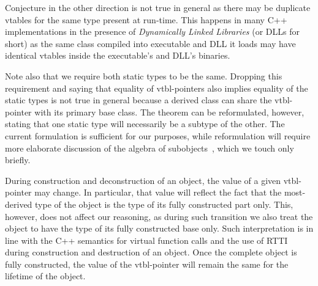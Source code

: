 \noindent
Conjecture in the other direction is not true in general as there may be 
duplicate vtables for the same type present at run-time. This happens in 
many C++ implementations in the presence of \emph{Dynamically Linked Libraries} 
(or DLLs for short) as the same class compiled into executable and DLL it loads 
may have identical vtables inside the executable's and DLL's binaries.

Note also that we require both static types to be the same. Dropping this 
requirement and saying that equality of vtbl-pointers also implies equality of 
the static types is not true in general because a derived class can share the 
vtbl-pointer with its primary base class. The theorem 
can be reformulated, however, stating that one static type will necessarily be a 
subtype of the other. The current formulation is sufficient for our purposes, 
while reformulation will require more elaborate discussion of the algebra 
of subobjects~\cite{RDL11}, which we touch only briefly.

%
%
%

During construction and deconstruction of 
an object, the value of a given vtbl-pointer may change. In particular, 
that value will reflect the fact that the most-derived type of the object is the type of its 
fully constructed part only. This, however, does not affect our reasoning, as during 
such transition we also treat the object to have the type of its fully 
constructed base only. Such interpretation is in line with the C++ semantics for 
virtual function calls and the use of RTTI during construction and destruction of an 
object. Once the complete object is fully constructed, the value of the 
vtbl-pointer will remain the same for the lifetime of the object.


